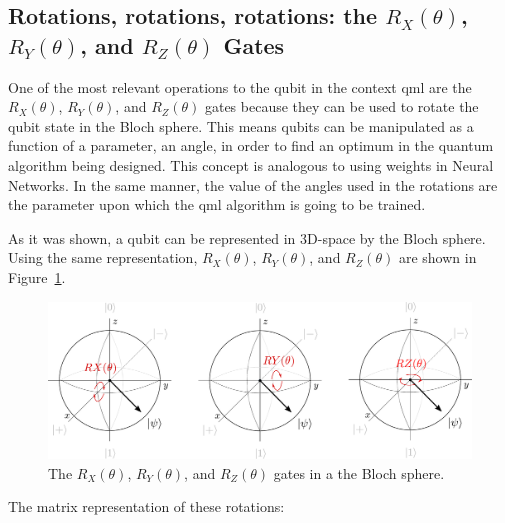 \subsection{Rotations, rotations, rotations: the $R_X(\theta)$, $R_Y(\theta)$, and $R_Z(\theta)$ Gates}
\label{sec:rot}

One of the most relevant operations to the qubit in the context \gls{qml} are 
the $R_X(\theta)$, $R_Y(\theta)$, and $R_Z(\theta)$ gates because they can be 
used to rotate the qubit state in the Bloch sphere. This means qubits can be 
manipulated as a function of a parameter, an angle, in order to find an optimum 
in the quantum algorithm being designed. This concept is analogous to using 
weights in Neural Networks. In the same manner, the value of the angles used in 
the rotations are the parameter upon which the \gls{qml} algorithm is going to 
be trained.

As it was shown, a qubit can be represented in 3D-space by the Bloch sphere. 
Using the same representation, $R_X(\theta)$, $R_Y(\theta)$, and $R_Z(\theta)$ 
are shown in Figure~\ref{fig:rots}.

\begin{figure}[!htbp]
\centering
	\includegraphics[width=1\textwidth]{figures/rotations.pdf}
\caption{The $R_X(\theta)$, $R_Y(\theta)$, and $R_Z(\theta)$ gates in a the Bloch sphere.}
\label{fig:rots}
\end{figure}

The matrix representation of these rotations:

